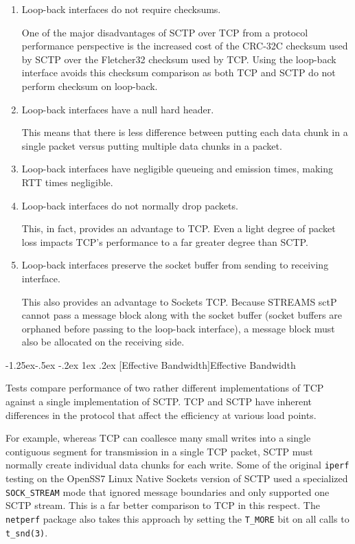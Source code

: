 \documentclass[letterpaper,final,notitlepage,twocolumn,10pt,twoside]{article}
\makeatletter
\let\normalsize = \small
\let\small = \footnotesize
\let\footnotesize = \scriptsize
\let\scriptsize = \tiny
\renewcommand\subsubsection{\@startsection{subsubsection}{3}{\z@}%
                                     {-1.25ex\@plus -.5ex \@minus -.2ex}%
                                     {1ex \@plus .2ex}%
                                     {\normalfont\normalsize\bfseries}}
\makeatother
\begin{document}
\begin{enumerate}

\item Loop-back interfaces do not require checksums.

One of the major disadvantages of SCTP over TCP from a protocol performance perspective is the
increased cost of the CRC-32C checksum used by SCTP over the Fletcher32 checksum used by TCP.  Using
the loop-back interface avoids this checksum comparison as both TCP and SCTP do not perform checksum
on loop-back.

\item Loop-back interfaces have a null hard header.

This means that there is less difference between putting each data chunk in a single packet versus
putting multiple data chunks in a packet.

\item Loop-back interfaces have negligible queueing and emission times, making RTT times negligible.

\item Loop-back interfaces do not normally drop packets.

This, in fact, provides an advantage to TCP.  Even a light degree of packet loss impacts TCP's
performance to a far greater degree than SCTP.

\item Loop-back interfaces preserve the socket buffer from sending to receiving interface.

This also provides an advantage to Sockets TCP.  Because STREAMS sctP cannot pass a message block
along with the socket buffer (socket buffers are orphaned before passing to the loop-back
interface), a message block must also be allocated on the receiving side.

\end{enumerate}

\subsubsection[Effective Bandwidth]{Effective Bandwidth}

Tests compare performance of two rather different implementations of TCP against a single
implementation of SCTP.  TCP and SCTP have inherent differences in the protocol that affect the
efficiency at various load points.

For example, whereas TCP can coallesce many small writes into a single contiguous segment for
transmission in a single TCP packet, SCTP must normally create individual data chunks for each
write.  Some of the original \texttt{iperf} testing on the OpenSS7 Linux Native Sockets version of
SCTP used a specialized \texttt{SOCK\_STREAM} mode that ignored message boundaries and only
supported one SCTP stream.  This is a far better comparison to TCP in this respect.  The
\texttt{netperf} package also takes this approach by setting the \texttt{T\_MORE} bit on all calls
to \texttt{t\_snd(3)}.
\end{document}
